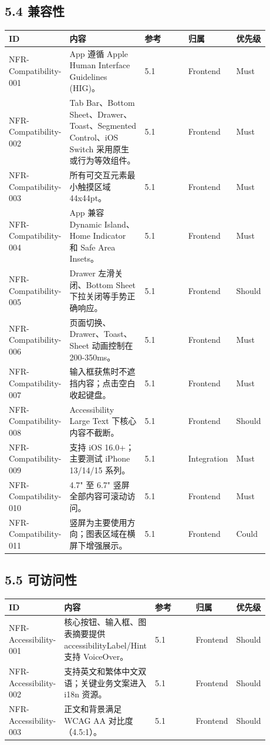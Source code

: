 \subsection{5.4 兼容性}

\begingroup
\small
\begin{longtable}{L{0.18\linewidth}L{0.30\linewidth}L{0.18\linewidth}L{0.12\linewidth}L{0.10\linewidth}}
\toprule
\textbf{ID} & \textbf{内容} & \textbf{参考} & \textbf{归属} & \textbf{优先级} \\
\midrule
NFR-Compatibility-001 & App 遵循 Apple Human Interface Guidelines (HIG)。 & 5.1 & Frontend & Must \\
NFR-Compatibility-002 & Tab Bar、Bottom Sheet、Drawer、Toast、Segmented Control、iOS Switch 采用原生或行为等效组件。 & 5.1 & Frontend & Must \\
NFR-Compatibility-003 & 所有可交互元素最小触摸区域 44x44pt。 & 5.1 & Frontend & Must \\
NFR-Compatibility-004 & App 兼容 Dynamic Island、Home Indicator 和 Safe Area Insets。 & 5.1 & Frontend & Must \\
NFR-Compatibility-005 & Drawer 左滑关闭、Bottom Sheet 下拉关闭等手势正确响应。 & 5.1 & Frontend & Should \\
NFR-Compatibility-006 & 页面切换、Drawer、Toast、Sheet 动画控制在 200-350ms。 & 5.1 & Frontend & Must \\
NFR-Compatibility-007 & 输入框获焦时不遮挡内容；点击空白收起键盘。 & 5.1 & Frontend & Must \\
NFR-Compatibility-008 & Accessibility Large Text 下核心内容不截断。 & 5.1 & Frontend & Should \\
NFR-Compatibility-009 & 支持 iOS 16.0+；主要测试 iPhone 13/14/15 系列。 & 5.1 & Integration & Must \\
NFR-Compatibility-010 & 4.7" 至 6.7" 竖屏全部内容可滚动访问。 & 5.1 & Frontend & Must \\
NFR-Compatibility-011 & 竖屏为主要使用方向；图表区域在横屏下增强展示。 & 5.1 & Frontend & Could \\
\bottomrule
\end{longtable}
\endgroup

\subsection{5.5 可访问性}

\begingroup
\small
\begin{longtable}{L{0.18\linewidth}L{0.30\linewidth}L{0.18\linewidth}L{0.12\linewidth}L{0.10\linewidth}}
\toprule
\textbf{ID} & \textbf{内容} & \textbf{参考} & \textbf{归属} & \textbf{优先级} \\
\midrule
NFR-Accessibility-001 & 核心按钮、输入框、图表摘要提供 accessibilityLabel/Hint 支持 VoiceOver。 & 5.1 & Frontend & Should \\
NFR-Accessibility-002 & 支持英文和繁体中文双语；关键业务文案进入 i18n 资源。 & 5.1 & Frontend & Should \\
NFR-Accessibility-003 & 正文和背景满足 WCAG AA 对比度（4.5:1）。 & 5.1 & Frontend & Should \\
\bottomrule
\end{longtable}
\endgroup

